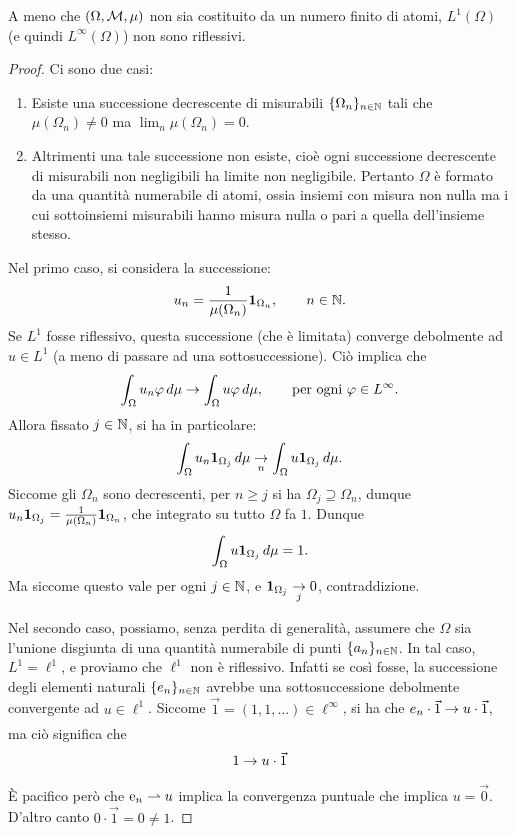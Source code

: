 \begin{theorem}
	A meno che $(\Omega, \M, \mu)$ non sia costituito da un numero finito di atomi, $L^1(\Omega)$ (e quindi $L^\infty(\Omega)$) non sono riflessivi.
\end{theorem}
\begin{proof}
	Ci sono due casi:
	\begin{enumerate}
		\item Esiste una successione decrescente di misurabili $\{\Omega_n\}_{n \in \N}$ tali che $\mu(\Omega_n) \neq 0$ ma $\lim_n \mu(\Omega_n) = 0$.

		\item Altrimenti una tale successione non esiste, cioè ogni successione decrescente di misurabili non negligibili ha limite non negligibile. Pertanto $\Omega$ è formato da una quantità numerabile di atomi, ossia insiemi con misura non nulla ma i cui sottoinsiemi misurabili hanno misura nulla o pari a quella dell'insieme stesso.
	\end{enumerate}

	Nel primo caso, si considera la successione:
	\begin{equation*}
		u_n = \frac1{\mu(\Omega_n)} \ind_{\Omega_n}, \qquad n \in \N.
	\end{equation*}
	Se $L^1$ fosse riflessivo, questa successione (che è limitata) converge debolmente ad $u \in L^1$ (a meno di passare ad una sottosuccessione). Ciò implica che
	\begin{equation*}
		\int_\Omega u_n \varphi \,d\mu \conv \int_\Omega u \varphi\,d\mu, \qquad \text{per ogni $\varphi \in L^\infty$}.
	\end{equation*}
	Allora fissato $j \in \N$, si ha in particolare:
	\begin{equation*}
		\int_\Omega u_n \ind_{\Omega_j} \,d\mu \conv[n] \int_\Omega u \ind_{\Omega_j}\,d\mu.
	\end{equation*}
	Siccome gli $\Omega_n$ sono decrescenti, per $n \geq j$ si ha $\Omega_j \supseteq \Omega_n$, dunque $u_n \ind_{\Omega_j} = \frac1{\mu(\Omega_n)} \ind_{\Omega_n}$, che integrato su tutto $\Omega$ fa $1$. Dunque
	\begin{equation*}
		\int_\Omega u \ind_{\Omega_j} \,d\mu = 1.
	\end{equation*}
	Ma siccome questo vale per ogni $j \in \N$, e $\ind_{\Omega_j} \conv[j] 0$, contraddizione.

	Nel secondo caso, possiamo, senza perdita di generalità, assumere che $\Omega$ sia l'unione disgiunta di una quantità numerabile di punti $\{a_n\}_{n \in \N}$. In tal caso, $L^1 = \ell^1$, e proviamo che $\ell^1$ non è riflessivo. Infatti se così fosse, la successione degli elementi naturali $\{e_n\}_{n \in \N}$ avrebbe una sottosuccessione debolmente convergente ad $u \in \ell^1$. Siccome $\vec 1 =(1,1, \ldots) \in \ell^\infty$, si ha che $e_n \cdot \vec 1 \conv u \cdot \vec 1$, ma ciò significa che
	\begin{equation*}
		1 \conv u \cdot \vec 1
	\end{equation*}
	È pacifico però che $\e_n \weakconv u$ implica la convergenza puntuale che implica $u= \vec 0$. D'altro canto $0 \cdot \vec 1 = 0 \neq 1$.


\end{proof}
